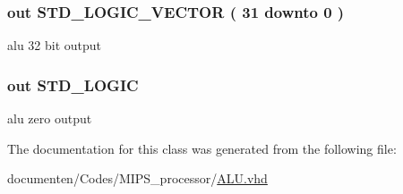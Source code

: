 \hypertarget{class_a_l_u_ac6d90f6d382114c0cfadc2c2cdc6559f}{
\subsubsection[{A\-L\-U\-\_\-\-Result}]{ {\bfseries \textcolor{vhdlkeyword}{out}\textcolor{vhdlchar}{ }} {\bfseries \textcolor{comment}{S\-T\-D\-\_\-\-L\-O\-G\-I\-C\-\_\-\-V\-E\-C\-T\-O\-R}\textcolor{vhdlchar}{ }\textcolor{vhdlchar}{(}\textcolor{vhdlchar}{ }\textcolor{vhdlchar}{ } \textcolor{vhdldigit}{31} \textcolor{vhdlchar}{ }\textcolor{vhdlchar}{ }\textcolor{vhdlchar}{ }\textcolor{vhdlkeyword}{downto}\textcolor{vhdlchar}{ }\textcolor{vhdlchar}{ }\textcolor{vhdlchar}{ } \textcolor{vhdldigit}{0} \textcolor{vhdlchar}{ }\textcolor{vhdlchar}{)}\textcolor{vhdlchar}{ }} \hspace{0.3cm}{\ttfamily [Port]}}}\label{class_a_l_u_ac6d90f6d382114c0cfadc2c2cdc6559f}


alu 32 bit output 

\hypertarget{class_a_l_u_aa94d8e6050f382eeb04dc3c7ac380f2e}{
\subsubsection[{A\-L\-U\-\_\-\-Zero}]{ {\bfseries \textcolor{vhdlkeyword}{out}\textcolor{vhdlchar}{ }} {\bfseries \textcolor{comment}{S\-T\-D\-\_\-\-L\-O\-G\-I\-C}\textcolor{vhdlchar}{ }} \hspace{0.3cm}{\ttfamily [Port]}}}\label{class_a_l_u_aa94d8e6050f382eeb04dc3c7ac380f2e}


alu zero output 



The documentation for this class was generated from the following file\-:\begin{DoxyCompactItemize}
\item 
documenten/\-Codes/\-M\-I\-P\-S\-\_\-processor/\hyperlink{_a_l_u_8vhd}{A\-L\-U.\-vhd}\end{DoxyCompactItemize}
